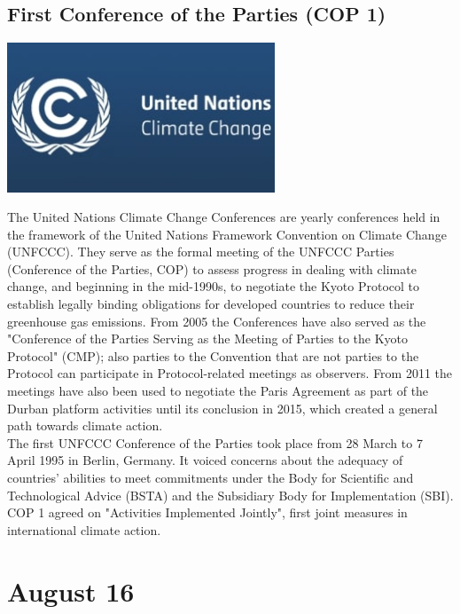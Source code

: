 \documentclass[11pt]{report}
\begin{document}
\subsection{First Conference of the Parties (COP 1)}
\vspace{2mm}\begin{center}\includegraphics[width=8cm]{./img/coplogo.jpg}\end{center}
The United Nations Climate Change Conferences are yearly conferences held in the framework of the United Nations Framework Convention on Climate Change (UNFCCC). They serve as the formal meeting of the UNFCCC Parties (Conference of the Parties, COP) to assess progress in dealing with climate change, and beginning in the mid-1990s, to negotiate the Kyoto Protocol to establish legally binding obligations for developed countries to reduce their greenhouse gas emissions. From 2005 the Conferences have also served as the "Conference of the Parties Serving as the Meeting of Parties to the Kyoto Protocol" (CMP); also parties to the Convention that are not parties to the Protocol can participate in Protocol-related meetings as observers. From 2011 the meetings have also been used to negotiate the Paris Agreement as part of the Durban platform activities until its conclusion in 2015, which created a general path towards climate action.\\
\indent The first UNFCCC Conference of the Parties took place from 28 March to 7 April 1995 in Berlin, Germany. It voiced concerns about the adequacy of countries' abilities to meet commitments under the Body for Scientific and Technological Advice (BSTA) and the Subsidiary Body for Implementation (SBI). COP 1 agreed on "Activities Implemented Jointly", first joint measures in international climate action.
\section{August 16}
\end{document}
